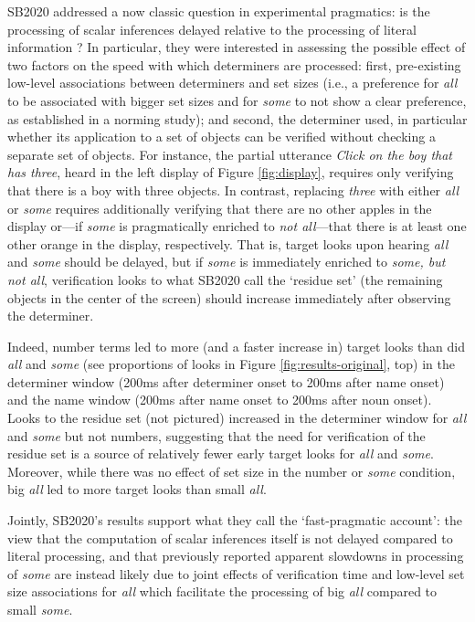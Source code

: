 \documentclass[10pt,letterpaper]{article}
\newcommand{\figref}[1]{Figure \ref{#1}}
\begin{document}
SB2020 addressed a now classic question in experimental pragmatics: is the processing of scalar inferences delayed relative to the processing of literal information \cite{bott2004, Breheny2006, huang2009, grodner2010, DegenT2016, Tomlinson2013}? In particular, they were interested in assessing the possible effect of two factors on the speed with which determiners are processed: first, pre-existing low-level associations between determiners and set sizes (i.e., a preference for \emph{all} to be associated with bigger set sizes and for \emph{some} to not show a clear preference, as established in a norming study); and second, the determiner used, in particular whether its application to a set of objects can be verified without checking a separate set of objects. For instance, the partial utterance \emph{Click on the boy that has three}, heard in the left display of \figref{fig:display}, requires only verifying that there is a boy with three objects. In contrast, replacing \emph{three} with either \emph{all} or \emph{some} requires additionally verifying that there are no other apples in the display or---if \emph{some} is pragmatically enriched to \emph{not all}---that there is at least one other orange in the display, respectively. That is, target looks upon hearing \emph{all} and \emph{some} should be delayed, but if \emph{some} is immediately enriched to \emph{some, but not all}, verification looks to what SB2020 call the `residue set' (the remaining objects in the center of the screen) should increase immediately after observing the determiner. 



Indeed, number terms led to more (and a faster increase in) target looks than did \emph{all} and \emph{some} (see proportions of looks in  \figref{fig:results-original}, top) in the determiner window (200ms after determiner onset to 200ms after name onset) and the name window (200ms after name onset to 200ms after noun onset). Looks to the residue set (not pictured) increased in the determiner window for \emph{all} and \emph{some} but not numbers,  suggesting that the need for verification of the residue set is a source of relatively fewer early target looks for \emph{all} and \emph{some}. Moreover, while there was no effect of set size in the number or \emph{some} condition, big \emph{all} led to more target looks than small \emph{all}. 

Jointly, SB2020's results support what they call the `fast-pragmatic account': the view that the computation of scalar inferences itself is not delayed compared to literal processing, and that previously reported apparent slowdowns in processing of \emph{some} are instead likely due to joint effects of verification time and low-level set size associations for \emph{all} which facilitate the processing of big \emph{all} compared to small \emph{some}. 
\end{document}
